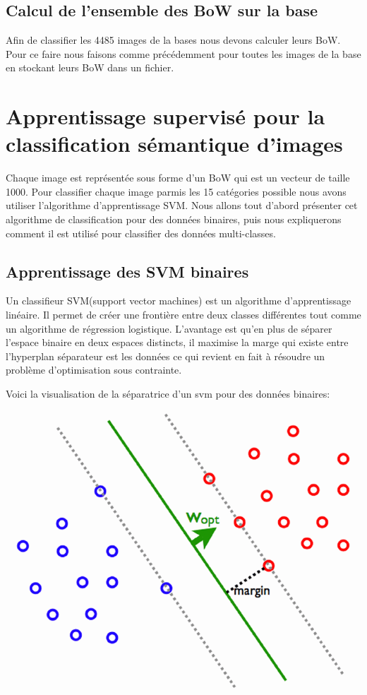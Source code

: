 \documentclass[a4paper]{article}
\begin{document}
\subsection{Calcul de l’ensemble des BoW sur la base}
Afin de classifier les 4485 images de la bases nous devons calculer leurs BoW. Pour ce faire nous faisons comme précédemment pour toutes les images de la base en stockant leurs BoW dans un fichier.



\section{Apprentissage supervisé pour la classification sémantique d'images}
Chaque image est représentée sous forme d'un BoW qui est un vecteur de taille 1000. Pour classifier chaque image parmis les 15 catégories possible nous avons utiliser l'algorithme d'apprentissage SVM. Nous allons tout d'abord présenter cet algorithme de classification pour des données binaires, puis nous expliquerons comment il est utilisé pour classifier des données multi-classes.
\subsection{Apprentissage des SVM binaires}
Un classifieur SVM(support vector machines) est un algorithme d'apprentissage linéaire. Il permet de créer une frontière entre deux classes différentes tout comme un algorithme de régression logistique. L'avantage est qu'en plus de séparer l'espace binaire en deux espaces distincts, il maximise la marge qui existe entre l'hyperplan séparateur est les données ce qui revient en fait à résoudre un problème d'optimisation sous contrainte.

Voici la visualisation de la séparatrice d'un svm pour des données binaires:\\
\begin{center}
\includegraphics[scale=0.3]{svm}
\end{center}
\end{document}
